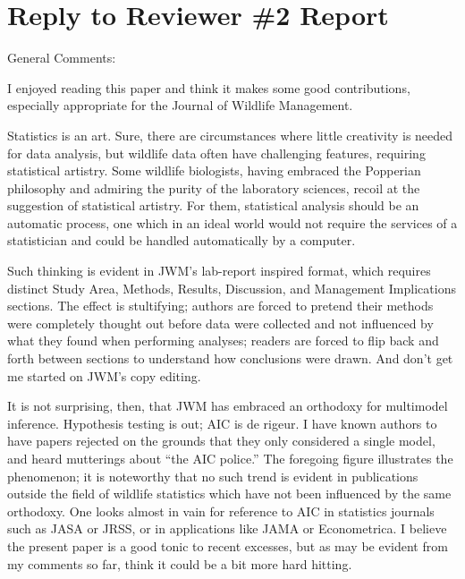\documentclass[12pt, titlepage]{article}
\begin{document}

\section{Reply to Reviewer \#2 Report}

\vspace{.5cm}
{\color{red!70!black} \noindent \Large General Comments:}

{\color{red!70!black}
I enjoyed reading this paper and think it makes some good contributions, especially appropriate for the Journal of Wildlife Management.

Statistics is an art. Sure, there are circumstances where little creativity is needed for data analysis, but wildlife data often have challenging features, requiring statistical artistry. Some wildlife biologists, having embraced the Popperian philosophy and admiring the purity of the laboratory sciences, recoil at the suggestion of statistical artistry. For them, statistical analysis should be an automatic process, one which in an ideal world would not require the services of a statistician and could be handled automatically by a computer.

Such thinking is evident in JWM’s lab-report inspired format, which requires distinct Study Area, Methods, Results, Discussion, and Management Implications sections. The effect is stultifying; authors are forced to pretend their methods were completely thought out before data were collected and not influenced by what they found when performing analyses; readers are forced to flip back and forth between sections to understand how conclusions were drawn. And don’t get me started on JWM’s copy editing.

It is not surprising, then, that JWM has embraced an orthodoxy for multimodel inference. Hypothesis testing is out; AIC is de rigeur. I have known authors to have papers rejected on the grounds that they only considered a single model, and heard mutterings about “the AIC police.” The foregoing figure illustrates the phenomenon; it is noteworthy that no such trend is evident in publications outside the field of wildlife statistics which have not been influenced by the same orthodoxy. One looks almost in vain for reference to AIC in statistics journals such as JASA or JRSS, or in applications like JAMA or Econometrica. I believe the present paper is a good tonic to recent excesses, but as may be evident from my comments so far, think it could be a bit more hard hitting.
}
\end{document}
